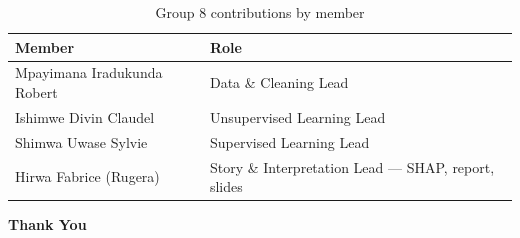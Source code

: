 \documentclass[11pt]{article}
\begin{document}
\begin{table}[H]
\centering
\begin{tabular}{p{}p{}}
\toprule
\textbf{Member} & \textbf{Role} \\
\midrule
Mpayimana Iradukunda Robert & Data \& Cleaning Lead \\
\addlinespace
Ishimwe Divin Claudel & Unsupervised Learning Lead \\
\addlinespace
Shimwa Uwase Sylvie & Supervised Learning Lead \\
\addlinespace
Hirwa Fabrice (Rugera) & Story \& Interpretation Lead --- SHAP, report, slides \\
\bottomrule
\end{tabular}
\caption{Group 8 contributions by member}
\end{table}

\begin{center}
    \vspace{1cm}
    \textbf{Thank You}
\end{center}
\end{document}
